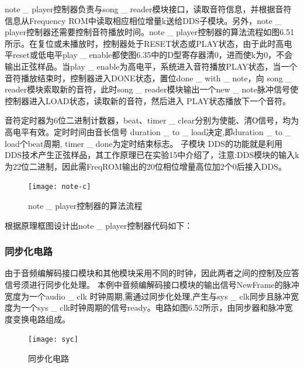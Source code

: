 \documentclass{../source/Experiment}
\begin{document}
                

                note \_ player控制器负责与song \_ reader模块接口，读取音符信息，并根据音符信息从Frequency ROM中读取相应相位增量k送给DDS子模块。另外，note \_ player控制器还需要控制音符播放时间。note \_ player控制器的算法流程如图6.51所示。在复位或未播放时，控制器处于RESET状态或PLAY状态，由于此时高电平reset或低电平play \_ enable都使图6.35中的D型寄存器清0，进而使k为0，不会输出正弦样品。当play \_ enable为高电平，系统进入音符播放PLAY状态，当一个音符播放结束时，控制器进入DONE状态，置位done \_ with \_ note，向 song \_ reader模块索取新的音符，此时song \_ reader模块输出一个new \_ note脉冲信号使控制器进入LOAD状态，读取新的音符，然后进入 PLAY状态播放下一个音符。

                音符定时器为6位二进制计数器，beat、timer \_ clear分别为使能、清О信号，均为高电平有效。定时时间由音长信号 duration \_ to \_ load决定,即duration \_ to \_ load个beat周期, timer \_ done为定时结束标志。
                子模块 DDS的功能就是利用DDS技术产生正弦样品，其工作原理已在实验15中介绍了，注意:DDS模块的输入k为22位二进制，因此需FreqROM输出的20位相位增量高位加2个0后接入DDS。

                \begin{figure}[H]
                    \centering
                    \texttt{[image: note-c]}
                    \caption{note \_ player控制器的算法流程}
                \end{figure}
                
                根据原理框图设计出note \_ player控制器代码如下：
                
            \subsubsection{同步化电路}

                由于音频编解码接口模块和其他模块采用不同的时钟，因此两者之间的控制及应答信号须进行同步化处理。
                本例中音频编解码接口模块的输出信号NewFrame的脉冲宽度为一个audio \_ clk 时钟周期,需通过同步化处理,产生与sys \_ clk同步且脉冲宽度为一个sys \_ clk时钟周期的信号ready。电路如图6.52所示，由同步器和脉冲宽度变换电路组成。

                \begin{figure}[H]
                    \centering
                    \texttt{[image: syc]}
                    \caption{同步化电路}
                \end{figure}
\end{document}
